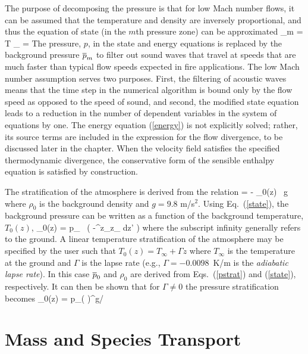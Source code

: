 The purpose of decomposing the pressure is that for low Mach number flows, it can be assumed that the temperature and density are inversely
proportional, and thus the equation of state (in the $m$th pressure zone) can be approximated
\be \bp_m  =  \rho T \R \sum_\alpha {} =   \label{state} \ee
The pressure, $p$, in the state and energy equations is replaced by the background pressure $\overline{p}_m$ to filter out sound waves
that travel at speeds that are much faster
than typical flow speeds expected in fire applications. The low Mach number assumption serves two purposes. First, the filtering of acoustic waves
means that the time step in the numerical algorithm is bound only by the flow speed as opposed to the speed of sound, and second, the modified state
equation leads to a reduction in the number of dependent variables in the system of equations by one. The energy equation (\ref{energy}) is not
explicitly solved; rather, its source terms are included in the expression for the flow divergence, to be discussed later in the chapter.  When the velocity field satisfies the specified thermodynamic divergence, the conservative form of the sensible enthalpy equation is satisfied by construction.

The stratification of the atmosphere is derived from the relation
\be {} = - \rho_0(z) \, g  \ee
where $\rho_0$ is the background density and $g=9.8$ m/s$^2$. Using Eq.~(\ref{state}), the background pressure can be written as a function of the background temperature, $T_0(z)$,
\be \bp_0(z) = p_\infty \; \exp \, \left( -\int^z_{z_\infty}  dz' \right)  \label{pstrat} \ee
where the subscript infinity generally refers to the ground. A linear temperature stratification of the atmosphere may be
specified by the user such that $T_0(z) = T_\infty + \Gamma z$ where $T_\infty$ is the temperature at the ground and
$\Gamma$ is the lapse rate (e.g., $\Gamma = -0.0098$~K/m is the {\em adiabatic lapse rate}).
In this case $\overline{p}_0$ and $\rho_0$ are derived from Eqs.~(\ref{pstrat}) and (\ref{state}), respectively.
It can then be shown that for $\Gamma \ne 0$ the pressure stratification becomes
\be
   \bp_0(z) = p_\infty  \left(  \right)^{g/\R \Gamma}
   \label{pstrat2}
\ee


\newpage

\section{Mass and Species Transport}

